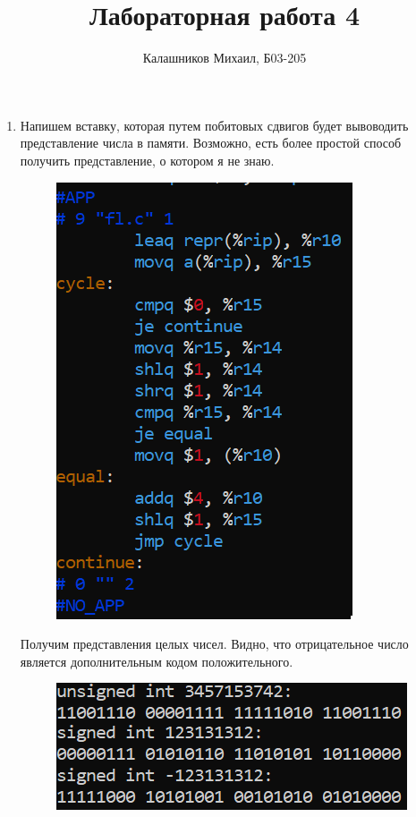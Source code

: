 \documentclass[a4paper,12pt]{article}
\title{Лабораторная работа 4}
\author{Калашников Михаил, Б03-205}
\date{}
\begin{document}

\begin{enumerate}

\setcounter{enumi}{0}

\item Напишем вставку, которая путем побитовых сдвигов будет вывоводить представление числа в памяти. Возможно, есть более простой способ получить представление, о котором я не знаю.

\begin{figure}[H]
  \centering
  \includegraphics[width=0.6\linewidth]{images/asm4_1.png}
  \caption{}
\end{figure}

Получим представления целых чисел. Видно, что отрицательное число является дополнительным кодом положительного.

\begin{figure}[H]
  \centering
  \includegraphics[width=0.6\linewidth]{images/asm4_2.png}
  \caption{}
\end{figure}


\end{enumerate}
\end{document}
